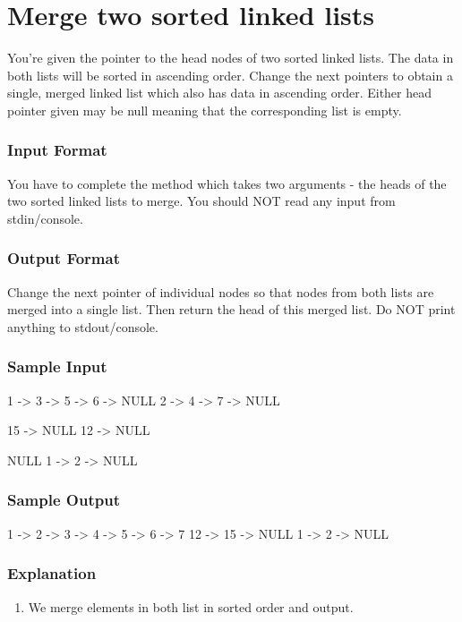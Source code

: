 \section{Merge two sorted linked lists} %
\label{sec:Merge-two-sorted-linked-lists}

You’re given the pointer to the head nodes of two sorted linked lists. The data in both lists will be sorted in ascending order. Change the next pointers to obtain a single, merged linked list which also has data in ascending order. Either head pointer given may be null meaning that the corresponding list is empty.


\subsubsection{Input Format}
You have to complete the  method which takes two arguments - the heads of the two sorted linked lists to merge. You should NOT read any input from stdin/console.


\subsubsection{Output Format}
Change the next pointer of individual nodes so that nodes from both lists are merged into a single list. Then return the head of this merged list. Do NOT print anything to stdout/console.


\subsubsection{Sample Input}
\begin{Code}
1 -> 3 -> 5 -> 6 -> NULL
2 -> 4 -> 7 -> NULL

15 -> NULL
12 -> NULL

NULL 
1 -> 2 -> NULL
\end{Code}


\subsubsection{Sample Output}
\begin{Code}
1 -> 2 -> 3 -> 4 -> 5 -> 6 -> 7
12 -> 15 -> NULL
1 -> 2 -> NULL
\end{Code}


\subsubsection{Explanation}
\begin{enumerate}
\item We merge elements in both list in sorted order and output.
\end{enumerate}


